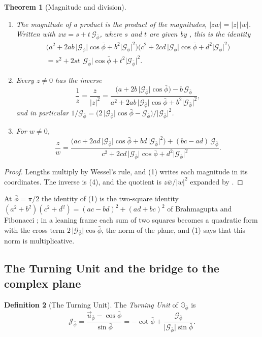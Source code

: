 \documentclass[11pt,a4paper]{amsart}
\theoremstyle{plain}
\newtheorem{theorem}{Theorem}[section]
\theoremstyle{definition}
\newtheorem{definition}[theorem]{Definition}
\theoremstyle{remark}
\newcommand{\pb}{\bar{\phi}}                     %
\newcommand{\Gp}{\mathcal{G}_{\bar{\phi}}}       %
\newcommand{\up}{\vec{u}_{\bar{\phi}}}           %
\newcommand{\Jp}{\mathcal{J}_{\bar{\phi}}}       %
\newcommand{\GNp}{\mathbb{G}_{\bar{\phi}}}       %
\begin{document}
\begin{theorem}[Magnitude and division]\label{thm:division}
\begin{enumerate}
  \item The magnitude of a product is the product of the magnitudes, $\lvert zw\rvert = \lvert z\rvert\,\lvert w\rvert$. Written with $zw = s + t\,\Gp$, where $s$ and $t$ are given by , this is the identity
  \begin{multline*}
  \bigl(a^2 + 2ab\,\lvert\Gp\rvert\cos\pb + b^2\lvert\Gp\rvert^2\bigr)\bigl(c^2 + 2cd\,\lvert\Gp\rvert\cos\pb + d^2\lvert\Gp\rvert^2\bigr) \\
  = s^2 + 2st\,\lvert\Gp\rvert\cos\pb + t^2\lvert\Gp\rvert^2 .
  \end{multline*}
  \item Every $z \neq 0$ has the inverse
  \[
  \frac{1}{z} = \frac{\bar{z}}{\lvert z\rvert^2} = \frac{\bigl(a + 2b\,\lvert\Gp\rvert\cos\pb\bigr) - b\,\Gp}{a^2 + 2ab\,\lvert\Gp\rvert\cos\pb + b^2\lvert\Gp\rvert^2} ,
  \]
  and in particular $1/\Gp = \bigl(2\,\lvert\Gp\rvert\cos\pb - \Gp\bigr)/\lvert\Gp\rvert^2$.
  \item For $w \neq 0$,
  \[
  \frac{z}{w} = \frac{\bigl(ac + 2ad\,\lvert\Gp\rvert\cos\pb + bd\,\lvert\Gp\rvert^2\bigr) + (bc - ad)\,\Gp}{c^2 + 2cd\,\lvert\Gp\rvert\cos\pb + d^2\lvert\Gp\rvert^2} .
  \]
\end{enumerate}
\end{theorem}

\begin{proof}
Lengths multiply by Wessel's rule, and (1) writes each magnitude in its coordinates. The inverse is (4), and the quotient is $z\bar{w}/\lvert w\rvert^2$ expanded by .
\end{proof}

At $\pb = \pi/2$ the identity of (1) is the two-square identity $(a^2 + b^2)(c^2 + d^2) = (ac - bd)^2 + (ad + bc)^2$ of Brahmagupta and Fibonacci \citep{Weil1984}; in a leaning frame each sum of two squares becomes a quadratic form with the cross term $2\,\lvert\Gp\rvert\cos\pb$, the norm of the plane, and (1) says that this norm is multiplicative.

\subsection{The Turning Unit and the bridge to the complex plane}\label{subsec:turning-unit}

\begin{definition}[The Turning Unit]\label{def:turning-unit}
The \emph{Turning Unit} of $\GNp$ is
\[
\Jp = \frac{\up - \cos\pb}{\sin\pb} = -\cot\pb + \frac{\Gp}{\lvert\Gp\rvert\sin\pb} .
\]
\end{definition}
\end{document}
